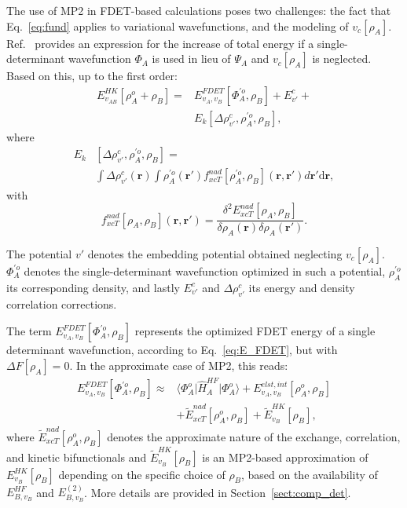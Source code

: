 \documentclass[journal=jctcce,manuscript=article, layout=twocolumn]{achemso}
\begin{document}
The use of MP2 in FDET-based calculations poses two challenges: the fact that Eq.~\ref{eq:fund} applies to variational wavefunctions, and the modeling of $v_c[\rho_A]$. Ref.~ provides an expression for the increase of total energy if a single-determinant wavefunction $\Phi_A$ is used in lieu of $\Psi_A$ and $v_c[\rho_A]$ is neglected. Based on this, up to the first order:
\begin{align} \label{eq:E_FDET_novc}
 E_{v_{AB}}^{HK}[\rho_A^{o}+\rho_B] =  & E_{v_A,v_B}^{FDET}[\Phi_{A}^{'o},\rho_B] + E^c_{v'} + \\ \nonumber
 & E_k[\Delta \rho^c_{v'}, \rho^{'o}_A, \rho_B],
\end{align}
where
\begin{align} \label{eq:kernel}
 E_k & [\Delta \rho^c_{v'}, \rho^{'o}_A, \rho_B] = \\ \nonumber
 & \int \Delta \rho^c_{v'}(\mathbf{r}) \int \rho^{'o}_A(\mathbf{r'})f^{nad}_{xcT}[\rho^{'o}_A, \rho_B](\mathbf{r},\mathbf{r'})d\mathbf{r'}\mathrm{d}\mathbf{r},
\end{align}
with
\begin{equation} \label{eq:f_nad}
 f^{nad}_{xcT}[\rho_A, \rho_B](\mathbf{r},\mathbf{r'}) = \frac{\delta^2 E^{nad}_{xcT}[\rho_A, \rho_B]}{\delta \rho_A(\mathbf{r}) \delta \rho_A(\mathbf{r'})}.
\end{equation}

The potential $v'$ denotes the embedding potential obtained neglecting $v_c[\rho_A]$. $\Phi^{'o}_A$ denotes the single-determinant wavefunction optimized in such a potential, $\rho^{'o}_A$ its corresponding density, and lastly $E^c_{v'}$ and $\Delta \rho^c_{v'}$ its energy and density correlation corrections.

The term $E_{v_A,v_B}^{FDET}[\Phi_{A}^{'o},\rho_B]$ represents the optimized FDET energy of a single determinant wavefunction, according to Eq.~\ref{eq:E_FDET}, but with $\Delta F[\rho_A] = 0$. In the approximate case of MP2, this reads:
\begin{align} \label{eq:E_FDET_v'}
 E_{v_A,v_B}^{FDET}[\Phi_{A}^{'o},\rho_B] \approx & \langle\Phi^{o}_{A}\vert \hat{H}^{HF}_A\vert \Phi^{o}_{A}\rangle + E^{elst,int}_{v_A,v_B}[\rho^{o}_A,\rho_B] \\ \nonumber
 & + \tilde{E}_{xcT}^{nad}[\rho^{o}_A,\rho_B] + \tilde{E}^{HK}_{v_B}[\rho_B], 
\end{align}
where $\tilde{E}_{xcT}^{nad}[\rho^{o}_A,\rho_B]$ denotes the approximate nature of the exchange, correlation, and kinetic bifunctionals and $ \tilde{E}^{HK}_{v_B}[\rho_B]$ is an MP2-based approximation of $E^{HK}_{v_B}[\rho_B]$ depending on the specific choice of $\rho_B$, based on the availability of $E^{HF}_{B,v_B}$ and $E^{(2)}_{B,v_B}$. More details are provided in Section~\ref{sect:comp_det}.
\end{document}
